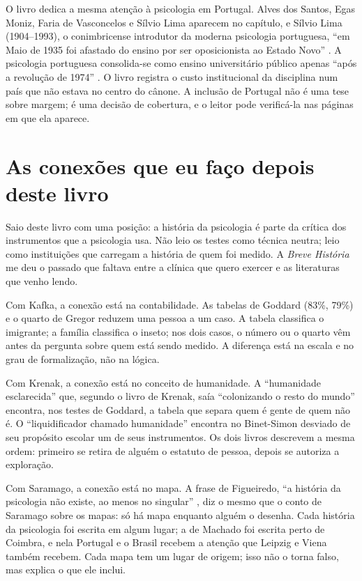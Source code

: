 \documentclass[12pt]{article}
\begin{document}
O livro dedica a mesma atenção à psicologia em Portugal. Alves dos Santos, Egas Moniz, Faria de Vasconcelos e Sílvio Lima aparecem no capítulo, e Sílvio Lima (1904--1993), o conimbricense introdutor da moderna psicologia portuguesa, ``em Maio de 1935 foi afastado do ensino por ser oposicionista ao Estado Novo'' \cite[p. 57]{machado}. A psicologia portuguesa consolida-se como ensino universitário público apenas ``após a revolução de 1974'' \cite[p. 57]{machado}. O livro registra o custo institucional da disciplina num país que não estava no centro do cânone. A inclusão de Portugal não é uma tese sobre margem; é uma decisão de cobertura, e o leitor pode verificá-la nas páginas em que ela aparece.

\section{As conexões que eu faço depois deste livro}

Saio deste livro com uma posição: a história da psicologia é parte da crítica dos instrumentos que a psicologia usa. Não leio os testes como técnica neutra; leio como instituições que carregam a história de quem foi medido. A \emph{Breve História} me deu o passado que faltava entre a clínica que quero exercer e as literaturas que venho lendo.

Com Kafka, a conexão está na contabilidade. As tabelas de Goddard (83\%, 79\%) e o quarto de Gregor reduzem uma pessoa a um caso. A tabela classifica o imigrante; a família classifica o inseto; nos dois casos, o número ou o quarto vêm antes da pergunta sobre quem está sendo medido. A diferença está na escala e no grau de formalização, não na lógica.

Com Krenak, a conexão está no conceito de humanidade. A ``humanidade esclarecida'' que, segundo o livro de Krenak, saía ``colonizando o resto do mundo'' \cite[p. 11]{krenak2019} encontra, nos testes de Goddard, a tabela que separa quem é gente de quem não é. O ``liquidificador chamado humanidade'' \cite[p. 14]{krenak2019} encontra no Binet-Simon desviado de seu propósito escolar um de seus instrumentos. Os dois livros descrevem a mesma ordem: primeiro se retira de alguém o estatuto de pessoa, depois se autoriza a exploração.

Com Saramago, a conexão está no mapa. A frase de Figueiredo, ``a história da psicologia não existe, ao menos no singular'' \cite[p. 1]{machado}, diz o mesmo que o conto de Saramago sobre os mapas: só há mapa enquanto alguém o desenha. Cada história da psicologia foi escrita em algum lugar; a de Machado foi escrita perto de Coimbra, e nela Portugal e o Brasil recebem a atenção que Leipzig e Viena também recebem. Cada mapa tem um lugar de origem; isso não o torna falso, mas explica o que ele inclui.
\end{document}
